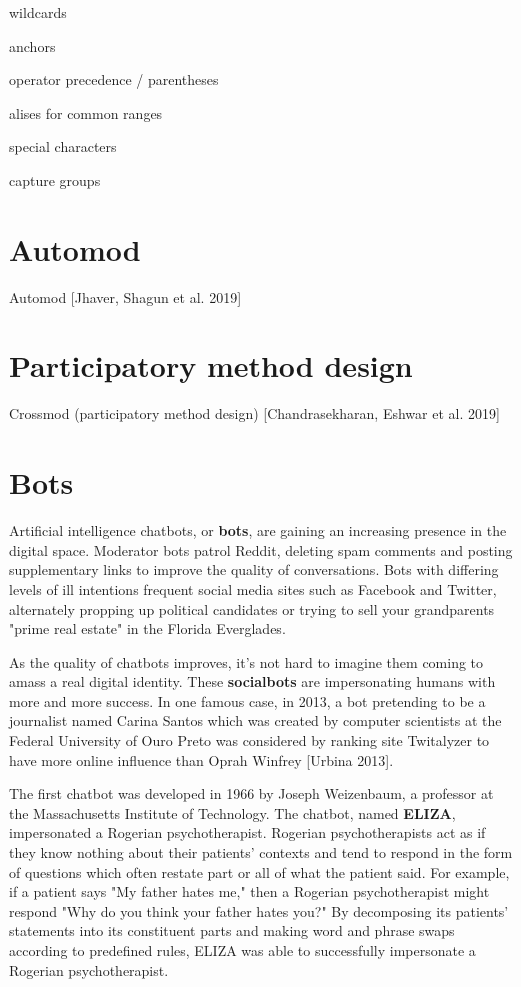 \documentclass[class=book, crop=false]{standalone}
\providecommand{\keyterm}[1]{\textbf{#1}\marginnote{\scriptsize \textbf{#1}}}
\begin{document}
wildcards

anchors

operator precedence / parentheses

alises for common ranges

special characters

capture groups

\section{Automod}

Automod [Jhaver, Shagun et al. 2019]

\section{Participatory method design}

Crossmod (participatory method design) [Chandrasekharan, Eshwar et al. 2019]

\section{Bots}

Artificial intelligence chatbots, or \keyterm{bots}, are gaining an increasing presence in the digital space. Moderator bots patrol Reddit, deleting spam comments and posting supplementary links to improve the quality of conversations. Bots with differing levels of ill intentions frequent social media sites such as Facebook and Twitter, alternately propping up political candidates or trying to sell your grandparents "prime real estate" in the Florida Everglades.

As the quality of chatbots improves, it's not hard to imagine them coming to amass a real digital identity. These \keyterm{socialbots} are impersonating humans with more and more success. In one famous case, in 2013, a bot pretending to be a journalist named Carina Santos which was created by computer scientists at the Federal University of Ouro Preto was considered by ranking site Twitalyzer to have more online influence than Oprah Winfrey [Urbina 2013].

The first chatbot was developed in 1966 by Joseph Weizenbaum, a professor at the Massachusetts Institute of Technology. The chatbot, named \keyterm{ELIZA}, impersonated a Rogerian psychotherapist. Rogerian psychotherapists act as if they know nothing about their patients' contexts and tend to respond in the form of questions which often restate part or all of what the patient said. For example, if a patient says "My father hates me," then a Rogerian psychotherapist might respond "Why do you think your father hates you?" By decomposing its patients' statements into its constituent parts and making word and phrase swaps according to predefined rules, ELIZA was able to successfully impersonate a Rogerian psychotherapist.
\end{document}
